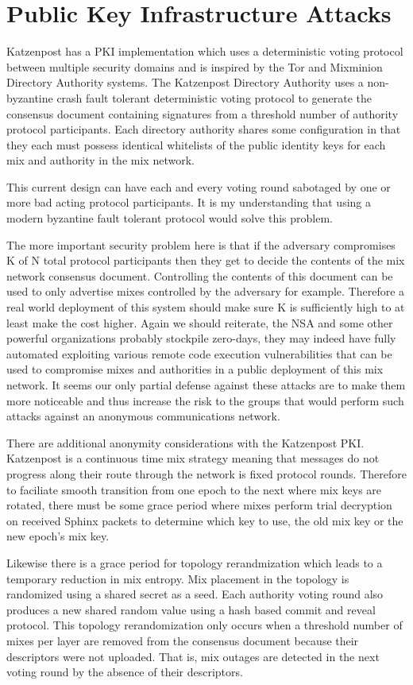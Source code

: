 \documentclass[conference]{IEEEtran}
\begin{document}
\section{Public Key Infrastructure Attacks}
Katzenpost has a PKI implementation which uses a deterministic voting
protocol between multiple security domains and is inspired by the Tor
and Mixminion Directory Authority systems. The Katzenpost Directory
Authority uses a non-byzantine crash fault tolerant deterministic
voting protocol to generate the consensus document containing
signatures from a threshold number of authority protocol
participants. Each directory authority shares some configuration in
that they each must possess identical whitelists of the public
identity keys for each mix and authority in the mix network.

This current design can have each and every voting round sabotaged by
one or more bad acting protocol participants. It is my understanding
that using a modern byzantine fault tolerant protocol would solve this
problem.

The more important security problem here is that if
the adversary compromises K of N total protocol participants then they
get to decide the contents of the mix network consensus
document. Controlling the contents of this document can be used to
only advertise mixes controlled by the adversary for
example. Therefore a real world deployment of this system should make
sure K is sufficiently high to at least make the cost higher. Again we
should reiterate, the NSA and some other powerful organizations
probably stockpile zero-days, they may indeed have fully automated
exploiting various remote code execution vulnerabilities that can be
used to compromise mixes and authorities in a public deployment of
this mix network. It seems our only partial defense against these
attacks are to make them more noticeable and thus increase the risk to
the groups that would perform such attacks against an anonymous
communications network.

There are additional anonymity considerations with the Katzenpost PKI.
Katzenpost is a continuous time mix strategy meaning that messages do
not progress along their route through the network is fixed protocol
rounds. Therefore to faciliate smooth transition from one epoch to the
next where mix keys are rotated, there must be some grace period where
mixes perform trial decryption on received Sphinx packets to determine
which key to use, the old mix key or the new epoch's mix key.

Likewise there is a grace period for topology rerandmization which
leads to a temporary reduction in mix entropy. Mix placement in the
topology is randomized using a shared secret as a seed. Each authority
voting round also produces a new shared random value using a hash
based commit and reveal protocol. This topology rerandomization only
occurs when a threshold number of mixes per layer are removed from the
consensus document because their descriptors were not uploaded. That
is, mix outages are detected in the next voting round by the absence
of their descriptors.
\end{document}
